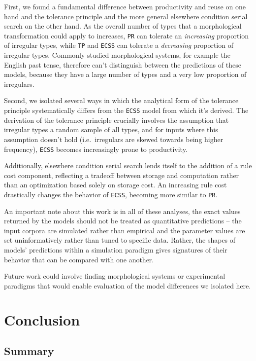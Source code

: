 \documentclass[
   11pt,
       ]{book}
\begin{document}
First, we found a fundamental difference between productivity and reuse on one
hand and the tolerance principle and the more general elsewhere condition
serial search on the other hand. As the overall number of types that a
morphological transformation could apply to increases, \texttt{PR} can tolerate an
\emph{increasing} proportion of irregular types, while \texttt{TP} and \texttt{ECSS} can tolerate
a \emph{decreasing} proportion of irregular types. Commonly studied morphological
systems, for example the English past tense, therefore can't distinguish between
the predictions of these models, because they have a large number of types and
a very low proportion of irregulars.

Second, we isolated several ways in which the analytical form of the tolerance
principle systematically differs from the \texttt{ECSS} model from which it's derived.
The derivation of the tolerance principle crucially involves the assumption
that irregular types a random sample of all types, and for inputs where this
assumption doesn't hold (i.e.~irregulars are skewed towards being higher
frequency), \texttt{ECSS} becomes increasingly prone to productivity.

Additionally, elsewhere condition serial search lends itself to the addition of
a rule cost component, reflecting a tradeoff between storage and computation
rather than an optimization based solely on storage cost. An increasing rule
cost drastically changes the behavior of \texttt{ECSS}, becoming more similar to \texttt{PR}.

An important note about this work is in all of these analyses, the exact values
returned by the models should not be treated as quantitative predictions -- the
input corpora are simulated rather than empirical and the parameter values are
set uninformatively rather than tuned to specific data. Rather, the shapes of
models' predictions within a simulation paradigm gives signatures of their
behavior that can be compared with one another.

Future work could involve finding morphological systems or experimental
paradigms that would enable evaluation of the model differences we isolated
here.

\hypertarget{conclusion}{%
\chapter{Conclusion}\label{conclusion}}

\hypertarget{summary}{%
\section{Summary}\label{summary}}
\end{document}
